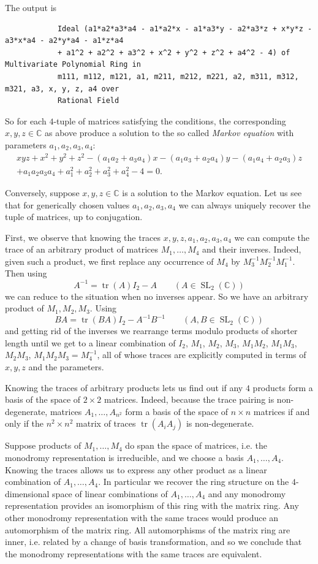 \documentclass[12pt]{amsart}
\theoremstyle{definition}
\theoremstyle{remark}
\numberwithin{equation}{section}
\newcommand{\BC}{\mathbb C}
\DeclareMathOperator{\SL}{SL}
\DeclareMathOperator{\trace}{tr}
\begin{document}
	The output is 
	{\small
		\begin{verbatim}
			Ideal (a1*a2*a3*a4 - a1*a2*x - a1*a3*y - a2*a3*z + x*y*z - a3*x*a4 - a2*y*a4 - a1*z*a4
			+ a1^2 + a2^2 + a3^2 + x^2 + y^2 + z^2 + a4^2 - 4) of Multivariate Polynomial Ring in 
			m111, m112, m121, a1, m211, m212, m221, a2, m311, m312, m321, a3, x, y, z, a4 over 
			Rational Field	
		\end{verbatim}
	}
	
	So for each $4$-tuple of matrices satisfying the conditions, the corresponding $x, y, z\in\BC$ as above produce a solution to the so called \emph{Markov equation} with parameters $a_1, a_2, a_3, a_4$:
	\begin{multline}\label{eq:markov}
		xyz + x^2 + y^2 + z^2 - (a_1 a_2 + a_3 a_4) x - (a_1 a_3 + a_2 a_4) y - (a_1 a_4 + a_2 a_3) z \\
		+ a_1 a_2 a_3 a_4 + a_1^2 + a_2^2 + a_3^2 + a_4^2 - 4=0.
	\end{multline}
	
	Conversely, suppose $x, y, z\in\BC$ is a solution to the Markov equation. Let us see that for generically chosen values $a_1, a_2, a_3, a_4$ we can always uniquely recover the tuple of matrices, up to conjugation.
	
	First, we observe that knowing the traces $x, y, z, a_1, a_2, a_3, a_4$ we can compute the trace of an arbitrary product of matrices $M_1,\ldots,M_4$ and their inverses. Indeed, given such a product, we first replace any occurrence of $M_4$ by $M_3^{-1} M_2^{-1} M_1^{-1}$. Then using 	
	\[
	A^{-1} = \trace(A) I_2 - A \qquad (A\in \SL_2(\BC))
	\]
	we can reduce to the situation when no inverses appear. So we have an arbitrary product of $M_1, M_2, M_3$. Using
	\[
	BA = \trace(BA) I_2 - A^{-1} B^{-1} \qquad (A,B\in \SL_2(\BC))
	\]
	and getting rid of the inverses we rearrange terms modulo products of shorter length until we get to a linear combination of $I_2$, $M_1$, $M_2$, $M_3$, $M_1 M_2$, $M_1 M_3$, $M_2 M_3$, $M_1 M_2 M_3=M_4^{-1}$, all of whose traces are explicitly computed in terms of $x, y, z$ and the parameters.
	
	Knowing the traces of arbitrary products lets us find out if any $4$ products form a basis of the space of $2\times 2$ matrices. Indeed, because the trace pairing is non-degenerate, matrices $A_1,\ldots,A_{n^2}$ form a basis of the space of $n\times n$ matrices if and only if the $n^2 \times n^2$ matrix of traces $\trace(A_i A_j)$ is non-degenerate.
	
	Suppose products of $M_1,\ldots,M_4$ do span the space of matrices, i.e. the monodromy representation is irreducible, and we choose a basis $A_1, \ldots, A_4$. Knowing the traces allows us to express any other product as a linear combination of $A_1,\ldots, A_4$. In particular we recover the ring structure on the $4$-dimensional space of linear combinations of $A_1,\ldots,A_4$ and any monodromy representation provides an isomorphism of this ring with the matrix ring. Any other monodromy representation with the same traces would produce an automorphism of the matrix ring. All automorphisms of the matrix ring are inner, i.e. related by a change of basis transformation, and so we conclude that the monodromy representations with the same traces are equivalent.
	
\end{document}
